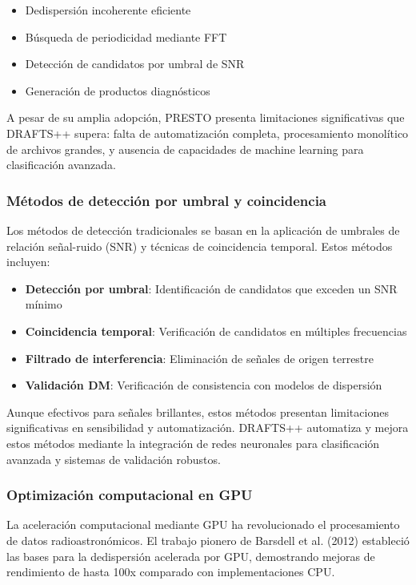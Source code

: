 \begin{itemize}
    \item Dedispersión incoherente eficiente
    \item Búsqueda de periodicidad mediante FFT
    \item Detección de candidatos por umbral de SNR
    \item Generación de productos diagnósticos
\end{itemize}

A pesar de su amplia adopción, PRESTO presenta limitaciones significativas que DRAFTS++ supera: falta de automatización completa, procesamiento monolítico de archivos grandes, y ausencia de capacidades de machine learning para clasificación avanzada.

\subsubsection{Métodos de detección por umbral y coincidencia}

Los métodos de detección tradicionales se basan en la aplicación de umbrales de relación señal-ruido (SNR) y técnicas de coincidencia temporal. Estos métodos incluyen:

\begin{itemize}
    \item \textbf{Detección por umbral}: Identificación de candidatos que exceden un SNR mínimo
    \item \textbf{Coincidencia temporal}: Verificación de candidatos en múltiples frecuencias
    \item \textbf{Filtrado de interferencia}: Eliminación de señales de origen terrestre
    \item \textbf{Validación DM}: Verificación de consistencia con modelos de dispersión
\end{itemize}

Aunque efectivos para señales brillantes, estos métodos presentan limitaciones significativas en sensibilidad y automatización. DRAFTS++ automatiza y mejora estos métodos mediante la integración de redes neuronales para clasificación avanzada y sistemas de validación robustos.

\subsubsection{Optimización computacional en GPU}

La aceleración computacional mediante GPU ha revolucionado el procesamiento de datos radioastronómicos. El trabajo pionero de Barsdell et al. (2012) \cite{Barsdell_2012} estableció las bases para la dedispersión acelerada por GPU, demostrando mejoras de rendimiento de hasta 100x comparado con implementaciones CPU.

